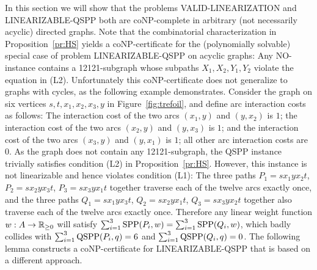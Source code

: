 \documentclass[11pt,fleqn]{article}
\begin{document}
In this section we will show that the problems VALID-LINEARIZATION and LI\-NEA\-RIZ\-ABLE-QSPP
both are coNP-complete in arbitrary (not necessarily acyclic) directed graphs.
Note that the combinatorial characterization in Proposition~\ref{pr:HS} yields a coNP-certificate 
for the (polynomially solvable) special case of problem LINEARIZABLE-QSPP on acyclic graphs:
Any NO-instance contains a 12121-subgraph whose subpaths $X_1,X_2,Y_1,Y_2$ violate the equation in (L2).
Unfortunately this coNP-certificate does not generalize to graphs with cycles, as the 
following example demonstrates.
Consider the graph on six vertices $s,t,x_1,x_2,x_3,y$ in Figure~\ref{fig:trefoil}, 
and define arc interaction costs as follows:
The interaction cost of the two arcs $(x_1,y)$ and $(y,x_2)$ is $1$; 
the interaction cost of the two arcs $(x_2,y)$ and $(y,x_3)$ is $1$; and
the interaction cost of the two arcs $(x_3,y)$ and $(y,x_1)$ is $1$;
all other arc interaction costs are~$0$.
As the graph does not contain any 12121-subgraph, the QSPP instance trivially satisfies 
condition (L2) in Proposition~\ref{pr:HS}.
However, this instance is not linearizable and hence violates condition (L1):
The three paths 
$P_1=sx_1yx_2t$, 
$P_2=sx_2yx_3t$,
$P_3=sx_3yx_1t$
together traverse each of the twelve arcs exactly once, and the three paths
$Q_1=sx_1yx_3t$,
$Q_2=sx_2yx_1t$,
$Q_3=sx_3yx_2t$
together also traverse each of the twelve arcs exactly once.
Therefore any linear weight function $w:A\to{\mathbb{R}_{\ge0}}$ will satisfy $\sum_{i=1}^3\text{SPP}(P_i,w)=\sum_{i=1}^3\text{SPP}(Q_i,w)$,
which badly collides with $\sum_{i=1}^3\text{QSPP}(P_i,q)=6$ and $\sum_{i=1}^3\text{QSPP}(Q_i,q)=0$.
The following lemma constructs a coNP-certificate for LINEARIZABLE-QSPP that is based on a 
different approach.
\end{document}

